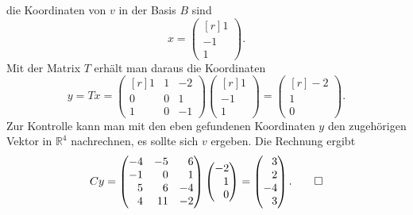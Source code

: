 \begin{loesung}
die Koordinaten von $v$ in der Basis $B$ sind 
\[
x
=
\begin{pmatrix*}[r]
1\\-1\\1
\end{pmatrix*}.
\]
Mit der Matrix $T$ erhält man daraus die Koordinaten
\[
y=T x=
\begin{pmatrix*}[r]
1&1&-2\\
0&0& 1\\
1&0&-1
\end{pmatrix*}
\begin{pmatrix*}[r]
1\\-1\\1
\end{pmatrix*}
=
\begin{pmatrix*}[r]
-2\\1\\0
\end{pmatrix*}.
\]
Zur Kontrolle kann man mit den eben gefundenen Koordinaten $y$ den
zugehörigen Vektor in $\mathbb R^4$ nachrechnen, es sollte sich $v$
ergeben. Die Rechnung ergibt
\[
C y=
\begin{pmatrix*}[r]
-4&-5& 6\\
-1& 0& 1\\
 5& 6&-4\\
 4&11&-2
\end{pmatrix*}
\begin{pmatrix*}[r]
-2\\1\\0
\end{pmatrix*}
=
\begin{pmatrix*}[r]
3\\2\\-4\\3
\end{pmatrix*}.
\qedhere
\]
\end{loesung}


